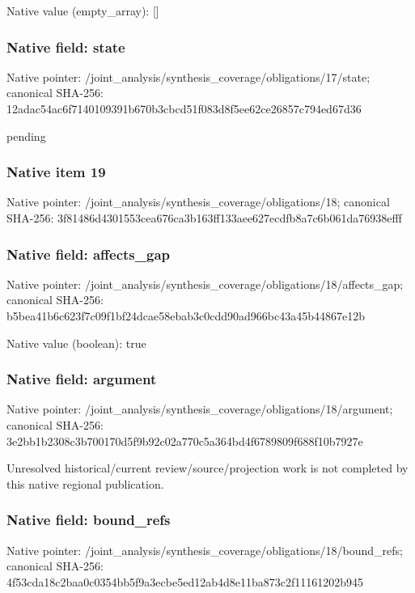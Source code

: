 \documentclass[10pt,a4paper]{article}
\begin{document}
Native value (empty\_\allowbreak{}array): []

\subsubsection{Native field: state}
Native pointer: /joint\_\allowbreak{}analysis/synthesis\_\allowbreak{}coverage/obligations/17/state; canonical SHA-256: 12adac54ac6f7140109391b670b3cbcd51f083d8f5ee62ce26857c794ed67d36

\begingroup\raggedright\sloppy pending\par\endgroup

\subsubsection{Native item 19}
Native pointer: /joint\_\allowbreak{}analysis/synthesis\_\allowbreak{}coverage/obligations/18; canonical SHA-256: 3f81486d4301553cea676ca3b163ff133aee627ecdfb8a7c6b061da76938efff

\subsubsection{Native field: affects\_\allowbreak{}gap}
Native pointer: /joint\_\allowbreak{}analysis/synthesis\_\allowbreak{}coverage/obligations/18/affects\_\allowbreak{}gap; canonical SHA-256: b5bea41b6c623f7c09f1bf24dcae58ebab3c0cdd90ad966bc43a45b44867e12b

Native value (boolean): true

\subsubsection{Native field: argument}
Native pointer: /joint\_\allowbreak{}analysis/synthesis\_\allowbreak{}coverage/obligations/18/argument; canonical SHA-256: 3e2bb1b2308c3b700170d5f9b92c02a770c5a364bd4f6789809f688f10b7927e

\begingroup\raggedright\sloppy Unresolved historical/\allowbreak{}current review/\allowbreak{}source/\allowbreak{}projection work is not completed by this native regional publication.\par\endgroup

\subsubsection{Native field: bound\_\allowbreak{}refs}
Native pointer: /joint\_\allowbreak{}analysis/synthesis\_\allowbreak{}coverage/obligations/18/bound\_\allowbreak{}refs; canonical SHA-256: 4f53cda18c2baa0c0354bb5f9a3ecbe5ed12ab4d8e11ba873c2f11161202b945
\end{document}
